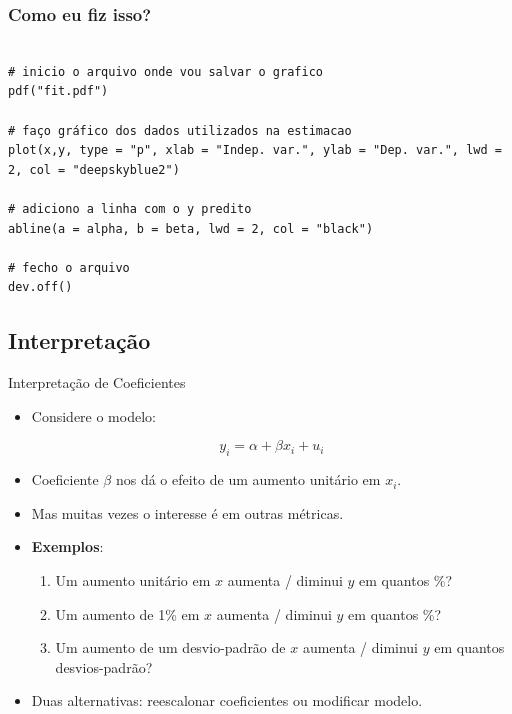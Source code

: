 \documentclass[10pt,slides,xcolor=pdftex,dvipsnames,table]{beamer}
\begin{document}

\begin{frame}[fragile]
	\frametitle{Como eu fiz isso?}

\begin{lstlisting}

# inicio o arquivo onde vou salvar o grafico
pdf("fit.pdf")   

# faço gráfico dos dados utilizados na estimacao 
plot(x,y, type = "p", xlab = "Indep. var.", ylab = "Dep. var.", lwd = 2, col = "deepskyblue2") 

# adiciono a linha com o y predito
abline(a = alpha, b = beta, lwd = 2, col = "black") 

# fecho o arquivo
dev.off()   

\end{lstlisting}

\end{frame}


\subsection{Interpretação}


\begin{frame}{Interpretação de Coeficientes}

\begin{itemize}\itemsep1.2em

    \item Considere o modelo:
    
    $$ y_i = \alpha + \beta x_i + u_i $$
    
    \item Coeficiente $\beta$ nos dá o efeito de um aumento unitário em $x_i$. 
    
    \item Mas muitas vezes o interesse é em outras métricas.
    
    \item \textbf{Exemplos}:
    
    \begin{enumerate}
    \item Um aumento unitário em $x$ aumenta / diminui $y$ em quantos \%?
    \item Um aumento de 1\% em $x$ aumenta / diminui $y$ em quantos \%?
    \item Um aumento de um desvio-padrão de $x$ aumenta / diminui $y$ em quantos desvios-padrão?   
	\end{enumerate}     
    
	\item Duas alternativas: reescalonar coeficientes ou modificar modelo.     
    
    \end{itemize}

\end{frame}
\end{document}
